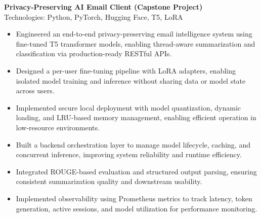 \documentclass[11pt]{article}
\begin{document}
\textbf{Privacy-Preserving AI Email Client (Capstone Project)} \\
Technologies: Python, PyTorch, Hugging Face, T5, LoRA
\begin{itemize}[leftmargin=15pt,itemsep=-6pt]

\item Engineered an end-to-end privacy-preserving email intelligence system using fine-tuned T5 transformer models, enabling thread-aware summarization and classification via production-ready RESTful APIs.

\item Designed a per-user fine-tuning pipeline with LoRA adapters, enabling isolated model training and inference without sharing data or model state across users.

\item Implemented secure local deployment with model quantization, dynamic loading, and LRU-based memory management, enabling efficient operation in low-resource environments.

\item Built a backend orchestration layer to manage model lifecycle, caching, and concurrent inference, improving system reliability and runtime efficiency.

\item Integrated ROUGE-based evaluation and structured output parsing, ensuring consistent summarization quality and downstream usability.

\item Implemented observability using Prometheus metrics to track latency, token generation, active sessions, and model utilization for performance monitoring.
\end{itemize}
\end{document}
